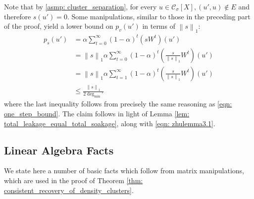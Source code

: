 \documentclass[11pt,twoside]{article}
\newcommand{\norm}[1]{\left\lVert#1\right\rVert}
\newcommand{\1}{\mathbf{1}}
\newcommand{\pbf}{p}        %
\newcommand{\Xbf}{X}             %
\newcommand{\Wbf}{W}
\newcommand{\Cset}{\mathcal{C}}
\newcommand{\Csig}{\Cset_{\sigma}}
\newcommand{\degminpr}{\deg_{\min}'}
\begin{document}
	Note that by \ref{asmp: cluster_separation}, for every $u \in \Csig[\Xbf], (u',u) \not\in E$ and therefore $s(u') = 0$. Some manipulations, similar to those in the preceding part of the proof, yield a lower bound on $\pbf_v(u')$ in terms of $\norm{s}_1$:
	\begin{align*}
	\pbf_s(u') & = \alpha \sum_{t = 0}^{\infty} (1 - \alpha)^t \left(s \Wbf^t\right)(u') \\
	& = \norm{s}_1 \alpha \sum_{t = 0}^{\infty} (1 - \alpha)^t \left(\frac{s}{\norm{s}_1} \Wbf^t\right)(u') \\
	& = \norm{s}_1 \alpha \sum_{t = 1}^{\infty} (1 - \alpha)^t \left(\frac{s}{\norm{s}_1} \Wbf^t\right)(u') \\
	& \leq \frac{\norm{s}_1}{2\degminpr}
	\end{align*}
	where the last inequality follows from precisely the same reasoning as \eqref{eqn: one_step_bound}. The claim follows in light of Lemma \ref{lem: total_leakage_equal_total_soakage}, along with \eqref{eqn: zhulemma3.1}.

\subsection{Linear Algebra Facts}
\label{sec: linalg}

We state here a number of basic facts which follow from matrix manipulations, which are used in the proof of Theorem \ref{thm: consistent_recovery_of_density_clusters}. 
\end{document}
